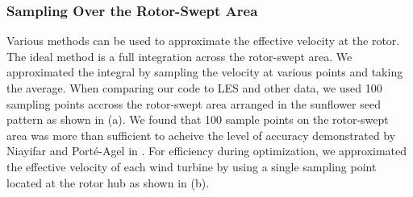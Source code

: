 \documentclass[conf]{new-aiaa}
\begin{document}
\subsubsection{Sampling Over the Rotor-Swept Area}
Various methods can be used to approximate the effective velocity at the rotor. The ideal method is a full integration across the rotor-swept area. We approximated the integral by sampling the velocity at various points and taking the average. 
When comparing our code to LES and other data, we used 100 sampling points accross the rotor-swept area arranged in the sunflower seed pattern as shown in (a). We found that 100 sample points on the rotor-swept area was more than sufficient to acheive the level of accuracy demonstrated by Niayifar and Port\'{e}-Agel in \cite{niayifar2016}. For efficiency during optimization, we approximated the effective velocity of each wind turbine by using a single sampling point located at the rotor hub as shown in (b).
\end{document}
